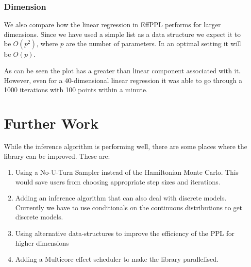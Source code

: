 \documentclass[a4paper,11pt]{article}
\theoremstyle{mytheor}
\begin{document}
        \subsubsection{Dimension}
        
        We also compare how the linear regression in EffPPL performs for larger dimensions. Since we have used a simple list as a data structure we expect it to be $O(p^2)$, where $p$ are the number of parameters. In an optimal setting it will be $O(p)$. 
        
        \begin{center}
        \end{center}
        
        As can be seen the plot has a greater than linear component associated with it. However, even for a 40-dimensional linear regression it was able to go through a 1000 iterations with 100 points within a minute.
        

\section{Further Work}

While the inference algorithm is performing well, there are some places where the library can be improved. These are:
\begin{enumerate}
    \item Using a No-U-Turn Sampler instead of the Hamiltonian Monte Carlo. This would save users from choosing appropriate step sizes and iterations.
    \item Adding an inference algorithm that can also deal with discrete models. Currently we have to use conditionals on the continuous distributions to get discrete models. 
    \item Using alternative data-structures to improve the efficiency of the PPL for higher dimensions
    \item Adding a Multicore effect scheduler to make the library parallelised. 
\end{enumerate}
\end{document}
